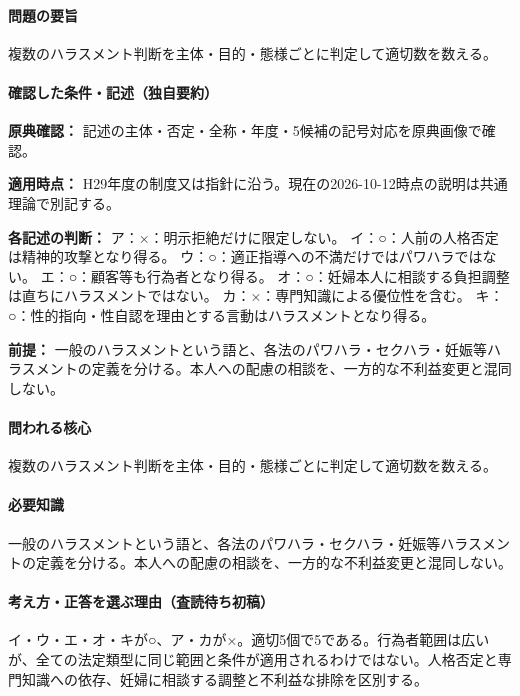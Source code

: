 \paragraph{問題の要旨} 複数のハラスメント判断を主体・目的・態様ごとに判定して適切数を数える。

\paragraph{確認した条件・記述（独自要約）}\mbox{}\par

\noindent\textbf{原典確認：} 記述の主体・否定・全称・年度・5候補の記号対応を原典画像で確認。\par

\noindent\textbf{適用時点：} H29年度の制度又は指針に沿う。現在の2026-10-12時点の説明は共通理論で別記する。\par

\noindent\textbf{各記述の判断：} ア：×：明示拒絶だけに限定しない。 イ：○：人前の人格否定は精神的攻撃となり得る。 ウ：○：適正指導への不満だけではパワハラではない。 エ：○：顧客等も行為者となり得る。 オ：○：妊婦本人に相談する負担調整は直ちにハラスメントではない。 カ：×：専門知識による優位性を含む。 キ：○：性的指向・性自認を理由とする言動はハラスメントとなり得る。\par

\noindent\textbf{前提：} 一般のハラスメントという語と、各法のパワハラ・セクハラ・妊娠等ハラスメントの定義を分ける。本人への配慮の相談を、一方的な不利益変更と混同しない。\par

\paragraph{問われる核心} 複数のハラスメント判断を主体・目的・態様ごとに判定して適切数を数える。

\paragraph{必要知識} 一般のハラスメントという語と、各法のパワハラ・セクハラ・妊娠等ハラスメントの定義を分ける。本人への配慮の相談を、一方的な不利益変更と混同しない。

\paragraph{考え方・正答を選ぶ理由（査読待ち初稿）} イ・ウ・エ・オ・キが○、ア・カが×。適切5個で5である。行為者範囲は広いが、全ての法定類型に同じ範囲と条件が適用されるわけではない。人格否定と専門知識への依存、妊婦に相談する調整と不利益な排除を区別する。

